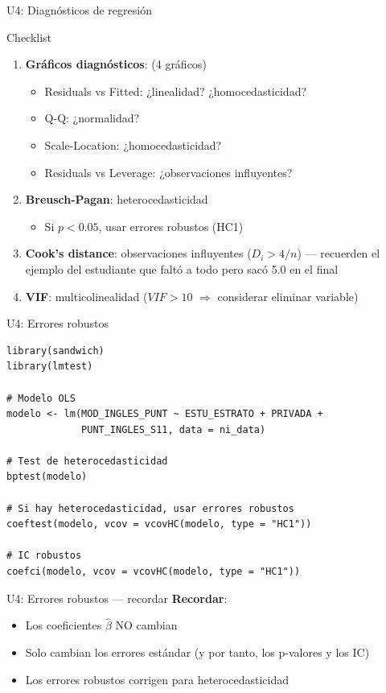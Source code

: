 \documentclass[aspectratio=169, 11pt]{beamer}
\begin{document}
\begin{frame}{U4: Diagnósticos de regresión}
\begin{block}{Checklist}
\small
\begin{enumerate}
\item \textbf{Gráficos diagnósticos}:  (4 gráficos)
  \begin{itemize}
  \item Residuals vs Fitted: ¿linealidad? ¿homocedasticidad?
  \item Q-Q: ¿normalidad?
  \item Scale-Location: ¿homocedasticidad?
  \item Residuals vs Leverage: ¿observaciones influyentes?
  \end{itemize}

\item \textbf{Breusch-Pagan}: heterocedasticidad
  \begin{itemize}
  \item Si $p < 0.05$, usar errores robustos (HC1)
  \end{itemize}

\item \textbf{Cook's distance}: observaciones influyentes ($D_i > 4/n$) --- recuerden el ejemplo del estudiante que falt\'o a todo pero sac\'o 5.0 en el final

\item \textbf{VIF}: multicolinealidad ($VIF > 10$ $\Rightarrow$ considerar eliminar variable)
\end{enumerate}
\end{block}
\end{frame}

\begin{frame}[fragile]{U4: Errores robustos}
\small
\begin{lstlisting}
library(sandwich)
library(lmtest)

# Modelo OLS
modelo <- lm(MOD_INGLES_PUNT ~ ESTU_ESTRATO + PRIVADA +
             PUNT_INGLES_S11, data = ni_data)

# Test de heterocedasticidad
bptest(modelo)

# Si hay heterocedasticidad, usar errores robustos
coeftest(modelo, vcov = vcovHC(modelo, type = "HC1"))

# IC robustos
coefci(modelo, vcov = vcovHC(modelo, type = "HC1"))
\end{lstlisting}
\end{frame}

\begin{frame}{U4: Errores robustos --- recordar}
\textbf{Recordar}:
\begin{itemize}
\item Los coeficientes $\hat{\beta}$ NO cambian
\item Solo cambian los errores estándar (y por tanto, los p-valores y los IC)
\item Los errores robustos corrigen para heterocedasticidad
\end{itemize}
\end{frame}
\end{document}

